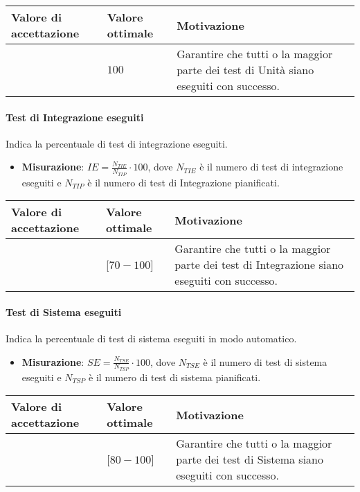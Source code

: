 \begin{center}
		\begin{tabular}{|P{2.5cm}|P{2.5cm}|P{6cm}|}
		\hline
			\textbf{Valore di accettazione}	& \textbf{Valore ottimale} & \textbf{Motivazione} \\
			\hline
			[$90 - 100$] & $100$ &	Garantire che tutti o la maggior parte dei test di Unità siano eseguiti con successo. \\
			\hline
			\end{tabular}
\end{center}


\paragraph{Test di Integrazione eseguiti}
Indica la percentuale di test di integrazione eseguiti.
\begin{itemize}
\item \textbf{Misurazione}: $IE=\frac{N_{TIE}}{N_{TIP}} \cdot 100$, dove $N_{TIE}$ è il numero di test di integrazione eseguiti e $N_{TIP}$ è il numero di test di Integrazione pianificati.
\end{itemize}

\begin{center}
		\begin{tabular}{|P{2.5cm}|P{2.5cm}|P{6cm}|}
		\hline
			\textbf{Valore di accettazione}	& \textbf{Valore ottimale} & \textbf{Motivazione} \\
			\hline
			[$60 - 100$] & [$70 - 100$] &	Garantire che tutti o la maggior parte dei test di Integrazione siano eseguiti con successo. \\
			\hline
			\end{tabular}
\end{center}


\paragraph{Test di Sistema eseguiti}
Indica la percentuale di test di sistema eseguiti in modo automatico.
\begin{itemize}
\item \textbf{Misurazione}: $SE=\frac{N_{TSE}}{N_{TSP}} \cdot 100$, dove $N_{TSE}$ è il numero di test di sistema eseguiti e $N_{TSP}$ è il numero di test di sistema pianificati.
\end{itemize}

\begin{center}
		\begin{tabular}{|P{2.5cm}|P{2.5cm}|P{6cm}|}
		\hline
			\textbf{Valore di accettazione}	& \textbf{Valore ottimale} & \textbf{Motivazione} \\
			\hline
			[$70 - 100$] & [$80 - 100$] &	Garantire che tutti o la maggior parte dei test di Sistema siano eseguiti con successo. \\
			\hline
			\end{tabular}
\end{center}

